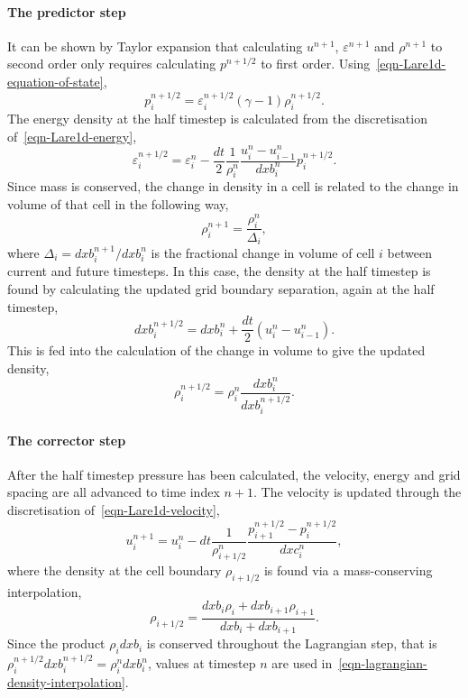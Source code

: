 \paragraph{The predictor step}
It can be shown by Taylor expansion that calculating $u^{n+1}$, $\varepsilon^{n+1}$ and $\rho^{n+1}$ to second order only requires calculating $p^{n+1/2}$ to first order. Using~\eqref{eqn-Lare1d-equation-of-state},
\begin{equation}
  p_i^{n+1/2} = \varepsilon_i^{n+1/2}(\gamma-1)\rho_i^{n+1/2}.
  \label{eqn-predictor-pressure}
\end{equation}
The energy density at the half timestep is calculated from the discretisation of~\eqref{eqn-Lare1d-energy},
\begin{equation}
  \varepsilon_i^{n+1/2} = \varepsilon_i^{n} - \frac{dt}{2} \frac{1}{\rho_i^n} \frac{u_i^n - u_{i-1}^n}{dxb_i^n}p_i^{n+1/2}.
  \label{eqn-predictor-energy}
\end{equation}
Since mass is conserved, the change in density in a cell is related to the change in volume of that cell in the following way,
\begin{equation}
  \rho_i^{n+1} = \frac{\rho_i^{n}}{\Delta_i},
\end{equation}
where $\Delta_i = dxb_i^{n+1}/dxb_i^{n}$ is the fractional change in volume of cell $i$ between current and future timesteps. In this case, the density at the half timestep is found by calculating the updated grid boundary separation, again at the half timestep,
\begin{equation}
  dxb_i^{n+1/2} = dxb_i^n + \frac{dt}{2}(u_i^n - u_{i-1}^n).
  \label{eqn-predictor-boundary-distance}
\end{equation}
This is fed into the calculation of the change in volume to give the updated density,
\begin{equation}
  \rho_i^{n+1/2} = \rho_i^n \frac{dxb_i^n}{dxb_i^{n+1/2}}.
  \label{eqn-predictor-density}
\end{equation}

\paragraph{The corrector step}
\label{sec-corrector-step}
After the half timestep pressure has been calculated, the velocity, energy and grid spacing are all advanced to time index $n+1$. The velocity is updated through the discretisation of~\eqref{eqn-Lare1d-velocity},
\begin{equation}
  u_i^{n+1} = u_i^n - dt \frac{1}{\rho^n_{i+1/2}}\frac{p^{n+1/2}_{i+1} - p^{n+1/2}_i}{dxc_i^n},
  \label{}
\end{equation}
where the density at the cell boundary $\rho_{i+1/2}$ is found via a mass-conserving interpolation,
\begin{equation}
  \rho_{i+1/2} = \frac{dxb_i \rho_i + dxb_{i+1}\rho_{i+1}}{dxb_i + dxb_{i+1}}.
  \label{eqn-lagrangian-density-interpolation}
\end{equation}
Since the product $\rho_i dxb_i$ is conserved throughout the Lagrangian step, that is $\rho_i^{n+1/2} dxb_i^{n+1/2} = \rho_i^n dxb_i^n$, values at timestep $n$ are used in~\eqref{eqn-lagrangian-density-interpolation}.

